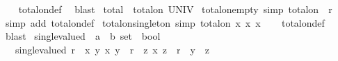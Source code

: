 \begin{isabellebody}
%
\isadelimproof
\ \ %
\endisadelimproof
%
\isatagproof
{}\isamarkupfalse%
\ total{\isacharunderscore}{\kern0pt}on{\isacharunderscore}{\kern0pt}def\ \isamarkupfalse%
\ blast%
\endisatagproof
{\isafoldproof}%
%
\isadelimproof
\isanewline
%
\endisadelimproof
\isanewline
{}\isamarkupfalse%
\ {\isachardoublequoteopen}total\ {\isasymequiv}\ total{\isacharunderscore}{\kern0pt}on\ UNIV{\isachardoublequoteclose}\isanewline
\isanewline
{}\isamarkupfalse%
\ total{\isacharunderscore}{\kern0pt}on{\isacharunderscore}{\kern0pt}empty\ {\isacharbrackleft}{\kern0pt}simp{\isacharbrackright}{\kern0pt}{\isacharcolon}{\kern0pt}\ {\isachardoublequoteopen}total{\isacharunderscore}{\kern0pt}on\ {\isacharbraceleft}{\kern0pt}{\isacharbraceright}{\kern0pt}\ r{\isachardoublequoteclose}\isanewline
%
\isadelimproof
\ \ %
\endisadelimproof
%
\isatagproof
{}\isamarkupfalse%
\ {\isacharparenleft}{\kern0pt}simp\ add{\isacharcolon}{\kern0pt}\ total{\isacharunderscore}{\kern0pt}on{\isacharunderscore}{\kern0pt}def{\isacharparenright}{\kern0pt}%
\endisatagproof
{\isafoldproof}%
%
\isadelimproof
\isanewline
%
\endisadelimproof
\isanewline
{}\isamarkupfalse%
\ total{\isacharunderscore}{\kern0pt}on{\isacharunderscore}{\kern0pt}singleton\ {\isacharbrackleft}{\kern0pt}simp{\isacharbrackright}{\kern0pt}{\isacharcolon}{\kern0pt}\ {\isachardoublequoteopen}total{\isacharunderscore}{\kern0pt}on\ {\isacharbraceleft}{\kern0pt}x{\isacharbraceright}{\kern0pt}\ {\isacharbraceleft}{\kern0pt}{\isacharparenleft}{\kern0pt}x{\isacharcomma}{\kern0pt}\ x{\isacharparenright}{\kern0pt}{\isacharbraceright}{\kern0pt}{\isachardoublequoteclose}\isanewline
%
\isadelimproof
\ \ %
\endisadelimproof
%
\isatagproof
{}\isamarkupfalse%
\ total{\isacharunderscore}{\kern0pt}on{\isacharunderscore}{\kern0pt}def\ \isamarkupfalse%
\ blast%
\endisatagproof
{\isafoldproof}%
%
\isadelimproof
%
\endisadelimproof
%
\isadelimdocument
%
\endisadelimdocument
%
\isatagdocument
%
\isamarkuptrue%
%
\endisatagdocument
{\isafolddocument}%
%
\isadelimdocument
%
\endisadelimdocument
{}\isamarkupfalse%
\ single{\isacharunderscore}{\kern0pt}valued\ {\isacharcolon}{\kern0pt}{\isacharcolon}{\kern0pt}\ {\isachardoublequoteopen}{\isacharparenleft}{\kern0pt}{\isacharprime}{\kern0pt}a\ {\isasymtimes}\ {\isacharprime}{\kern0pt}b{\isacharparenright}{\kern0pt}\ set\ {\isasymRightarrow}\ bool{\isachardoublequoteclose}\isanewline
\ \ \ {\isachardoublequoteopen}single{\isacharunderscore}{\kern0pt}valued\ r\ {\isasymlongleftrightarrow}\ {\isacharparenleft}{\kern0pt}{\isasymforall}x\ y{\isachardot}{\kern0pt}\ {\isacharparenleft}{\kern0pt}x{\isacharcomma}{\kern0pt}\ y{\isacharparenright}{\kern0pt}\ {\isasymin}\ r\ {\isasymlongrightarrow}\ {\isacharparenleft}{\kern0pt}{\isasymforall}z{\isachardot}{\kern0pt}\ {\isacharparenleft}{\kern0pt}x{\isacharcomma}{\kern0pt}\ z{\isacharparenright}{\kern0pt}\ {\isasymin}\ r\ {\isasymlongrightarrow}\ y\ {\isacharequal}{\kern0pt}\ z{\isacharparenright}{\kern0pt}{\isacharparenright}{\kern0pt}{\isachardoublequoteclose}\isanewline

\end{isabellebody}

